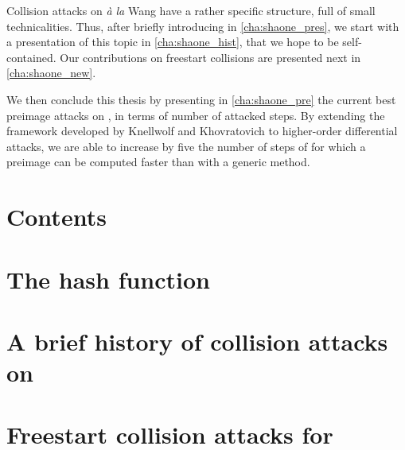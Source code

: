Collision attacks on \shaone \emph{à la} Wang have a rather specific structure, full of small technicalities. Thus, after briefly
introducing \shaone in \autoref{cha:shaone_pres}, we start with a presentation of this topic in \autoref{cha:shaone_hist},
that we hope to be self-contained. Our contributions on freestart collisions are presented next in \autoref{cha:shaone_new}.

We then conclude this thesis by presenting in \autoref{cha:shaone_pre}
the current best preimage attacks on \shaone, in terms of number of attacked steps. By extending the framework developed by Knellwolf and Khovratovich to
higher-order differential attacks, we are able to increase by five the number of steps of \shaone for which a preimage can be computed faster than with
a generic method.



\cleardoublepage
\chapter*{Contents}
\parttoc





\chapter[Présentation de \shaone]
        {The \shaone hash function}
\label{cha:shaone_pres}
\pagestyle{ruled}






\chapter[Une brève histoire des attaques en collision sur \shaone]
        {A brief history of collision attacks on \shaone}
\label{cha:shaone_hist}



\chapter[Collisions à initialisation libre pour \shaone]
        {Freestart collision attacks for \shaone}
\label{cha:shaone_new}

